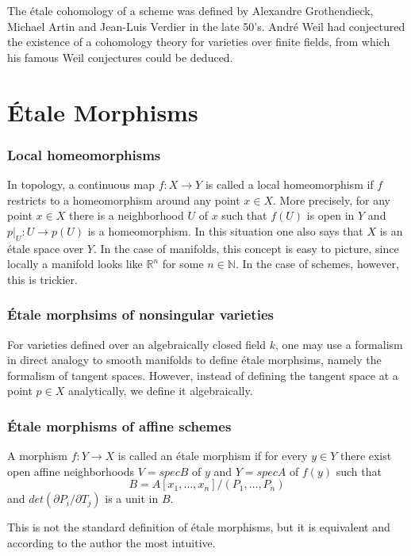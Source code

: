 The \'etale cohomology of a scheme was defined by Alexandre Grothendieck, Michael Artin and Jean-Luis Verdier in the late 50's. Andr\'e Weil had conjectured the existence of a cohomology theory for varieties over finite fields, from which his famous Weil conjectures could be deduced.

\section{\'Etale Morphisms}

\subsubsection{Local homeomorphisms}
In topology, a continuous map $f: X \to Y$ is called a local homeomorphism if $f$ restricts to a homeomorphism around any point $x \in X$. More precisely, for any point $x \in X$ there is a neighborhood $U$ of $x$ such that $f(U)$ is open in $Y$ and $p|_U: U \to p(U)$ is a homeomorphism. In this situation one also says that $X$ is an \'etale space over $Y$.
In the case of manifolds, this concept is easy to picture, since locally a manifold looks like $\mathbb{R}^n$ for some $n \in \mathbb{N}$. In the case of schemes, however, this is trickier.

\subsubsection{\'Etale morphsims of nonsingular varieties}
For varieties defined over an algebraically closed field $k$, one may use a formalism in direct analogy to smooth manifolds to define \'etale morphsims, namely the formalism of tangent spaces. However, instead of defining the tangent space at a point $p \in X$ analytically, we define it algebraically.

\subsubsection{\'Etale morphisms of affine schemes}
\begin{definition}
  A morphism $f: Y \to X$ is called an \'etale morphism if for every $y \in Y$ there exist open affine neighborhoods $V = spec B$ of $y$ and $Y = spec A$ of $f(y)$ such that 
  \[B = A[x_1, \dots, x_n]/(P_1, \dots, P_n)\]
  and $det(\partial P_i /\partial T_j)$ is a unit in $B$.
\end{definition}
This is not the standard definition of \'etale morphisms, but it is equivalent and according to the author the most intuitive.

